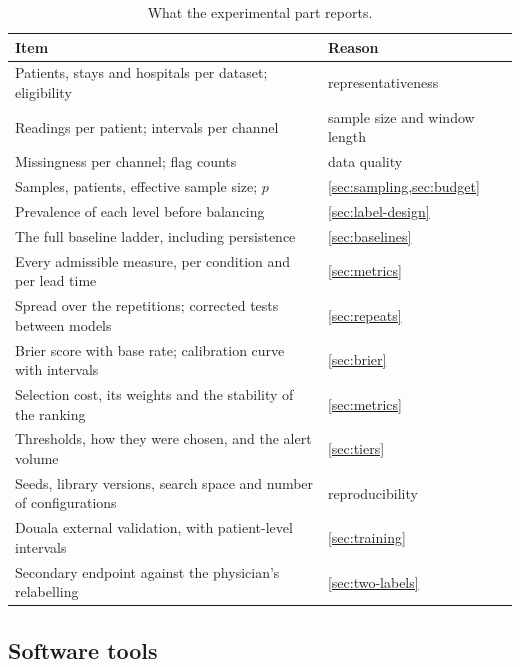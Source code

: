\begin{table}[htbp]
\centering\footnotesize
\caption{What the experimental part reports.}\label{tab:model-reporting}\label{tab:preprocessing-report}
\begin{tabularx}{\textwidth}{@{}X >{\raggedright\arraybackslash}p{4.4cm}@{}}
\toprule
\textbf{Item} & \textbf{Reason} \\
\midrule
Patients, stays and hospitals per dataset; eligibility & representativeness \\
Readings per patient; intervals per channel & sample size and window length \\
Missingness per channel; flag counts & data quality \\
Samples, patients, effective sample size; $p$ & \cref{sec:sampling,sec:budget} \\
Prevalence of each level before balancing & \cref{sec:label-design} \\
The full baseline ladder, including persistence & \cref{sec:baselines} \\
Every admissible measure, per condition and per lead time & \cref{sec:metrics} \\
Spread over the repetitions; corrected tests between models & \cref{sec:repeats} \\
Brier score with base rate; calibration curve with intervals & \cref{sec:brier} \\
Selection cost, its weights and the stability of the ranking & \cref{sec:metrics} \\
Thresholds, how they were chosen, and the alert volume & \cref{sec:tiers} \\
Seeds, library versions, search space and number of configurations & reproducibility \\
Douala external validation, with patient-level intervals & \cref{sec:training} \\
Secondary endpoint against the physician's relabelling & \cref{sec:two-labels} \\
\bottomrule
\end{tabularx}
\end{table}

\subsection{Software tools}\label{sec:tools}


